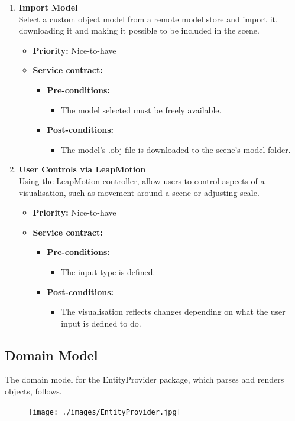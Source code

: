 \documentclass[a4paper,12pt]{article}
\begin{document}
\begin{enumerate}
			\item {\large \textbf{Import Model}}\\
			Select a custom object model from a remote model store and import it, downloading it and making it possible to be included in the scene.
			\begin{itemize}
				\item \textbf{Priority:} Nice-to-have
				\item \textbf{Service contract:}
				\begin{itemize}
					\item \textbf{Pre-conditions:}
						\begin{itemize}
							\item The model selected must be freely available.
						\end{itemize}
					\item \textbf{Post-conditions:}
						\begin{itemize}
							\item The model's .obj file is downloaded to the scene's model folder.
						\end{itemize}
				\end{itemize}
			\end{itemize}
			
			\item {\large \textbf{User Controls via LeapMotion}}\\
			Using the LeapMotion controller, allow users to control aspects of a visualisation, such as movement around a scene or adjusting scale.
			\begin{itemize}
				\item \textbf{Priority:} Nice-to-have
				\item \textbf{Service contract:}
				\begin{itemize}
					\item \textbf{Pre-conditions:}
						\begin{itemize}
							\item The input type is defined.
						\end{itemize}
					\item \textbf{Post-conditions:}
						\begin{itemize}
							\item The visualisation reflects changes depending on what the user input is defined to do. 
						\end{itemize}
				\end{itemize}
			\end{itemize}
		\end{enumerate}
	
	\subsection{Domain Model}
	The domain model for the EntityProvider package, which parses and renders objects, follows.
	
	\begin{figure}
		\texttt{[image: ./images/EntityProvider.jpg]}
	\end{figure}
	
%
%
\end{document}
